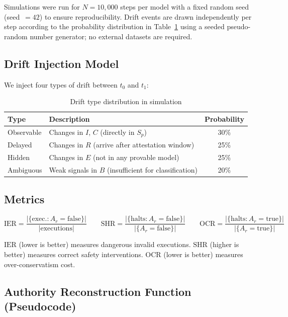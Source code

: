 \documentclass[11pt]{article}
\newcommand{\Sp}{S_p}
\newcommand{\Ar}{A_r}
\newcommand{\IER}{\mathrm{IER}}
\newcommand{\SHR}{\mathrm{SHR}}
\newcommand{\OCR}{\mathrm{OCR}}
\begin{document}
Simulations were run for $N = 10{,}000$ steps per model with a fixed random
seed (seed~$= 42$) to ensure reproducibility.
Drift events are drawn independently per step according to the probability
distribution in Table~\ref{tab:drift} using a seeded pseudo-random number
generator; no external datasets are required.

\subsection{Drift Injection Model}

We inject four types of drift between $t_0$ and $t_1$:

\begin{table}[H]
\centering
\caption{Drift type distribution in simulation}
\label{tab:drift}
\begin{tabular}{llc}
\toprule
\textbf{Type} & \textbf{Description} & \textbf{Probability} \\
\midrule
Observable  & Changes in $I$, $C$ (directly in $\Sp$)                & 30\% \\
Delayed     & Changes in $R$ (arrive after attestation window)        & 25\% \\
Hidden      & Changes in $E$ (not in any provable model)              & 25\% \\
Ambiguous   & Weak signals in $B$ (insufficient for classification)   & 20\% \\
\bottomrule
\end{tabular}
\end{table}

\subsection{Metrics}

\[
\IER = \frac{|\{\text{exec.}: \Ar = \text{false}\}|}{|\text{executions}|}
\qquad
\SHR = \frac{|\{\text{halts}: \Ar = \text{false}\}|}{|\{\Ar = \text{false}\}|}
\qquad
\OCR = \frac{|\{\text{halts}: \Ar = \text{true}\}|}{|\{\Ar = \text{true}\}|}
\]

$\IER$ (lower is better) measures dangerous invalid executions.
$\SHR$ (higher is better) measures correct safety interventions.
$\OCR$ (lower is better) measures over-conservatism cost.

\subsection{Authority Reconstruction Function (Pseudocode)}
\end{document}
